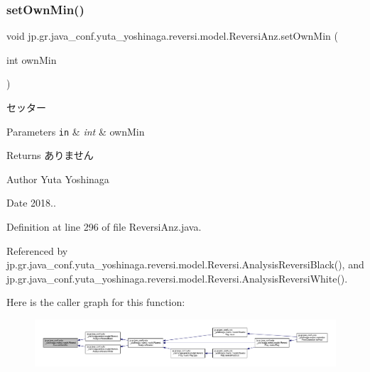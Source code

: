 \subsubsection{\texorpdfstring{set\+Own\+Min()}{setOwnMin()}}
{\footnotesize\ttfamily void jp.\+gr.\+java\+\_\+conf.\+yuta\+\_\+yoshinaga.\+reversi.\+model.\+Reversi\+Anz.\+set\+Own\+Min (\begin{DoxyParamCaption}\item[{int}]{own\+Min }\end{DoxyParamCaption})}



セッター 


\begin{DoxyParams}[1]{Parameters}
\mbox{\tt in}  & {\em int} & own\+Min \\
\hline
\end{DoxyParams}
\begin{DoxyReturn}{Returns}
ありません 
\end{DoxyReturn}
\begin{DoxyAuthor}{Author}
Yuta Yoshinaga 
\end{DoxyAuthor}
\begin{DoxyDate}{Date}
2018.. 
\end{DoxyDate}


Definition at line 296 of file Reversi\+Anz.\+java.



Referenced by jp.\+gr.\+java\+\_\+conf.\+yuta\+\_\+yoshinaga.\+reversi.\+model.\+Reversi.\+Analysis\+Reversi\+Black(), and jp.\+gr.\+java\+\_\+conf.\+yuta\+\_\+yoshinaga.\+reversi.\+model.\+Reversi.\+Analysis\+Reversi\+White().

Here is the caller graph for this function\+:
\nopagebreak
\begin{figure}[H]
\begin{center}
\leavevmode
\includegraphics[width=350pt]{classjp_1_1gr_1_1java__conf_1_1yuta__yoshinaga_1_1reversi_1_1model_1_1_reversi_anz_a992c733f3daddc0eb780618fc2925d5d_icgraph}
\end{center}
\end{figure}
\mbox{\label{classjp_1_1gr_1_1java__conf_1_1yuta__yoshinaga_1_1reversi_1_1model_1_1_reversi_anz_a61316f0f4b113c2c86cd0a7e12f26dfe}} 
